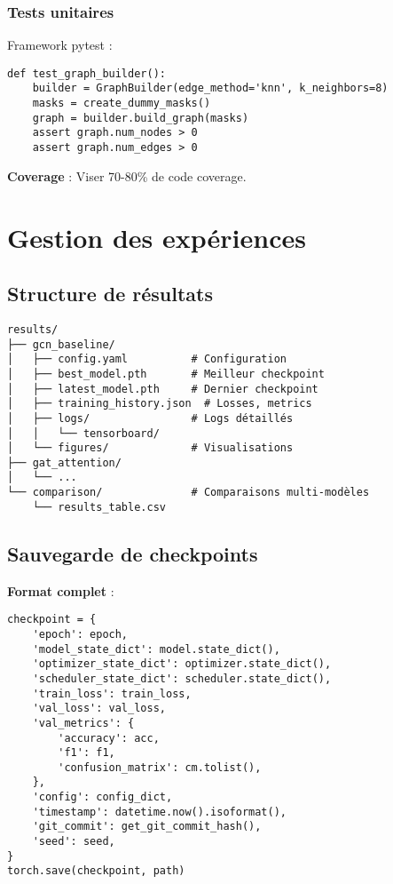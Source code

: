 \subsubsection{Tests unitaires}

Framework pytest :
\begin{verbatim}
def test_graph_builder():
    builder = GraphBuilder(edge_method='knn', k_neighbors=8)
    masks = create_dummy_masks()
    graph = builder.build_graph(masks)
    assert graph.num_nodes > 0
    assert graph.num_edges > 0
\end{verbatim}

\textbf{Coverage} : Viser 70-80\% de code coverage.

\section{Gestion des expériences}

\subsection{Structure de résultats}

\begin{verbatim}
results/
├── gcn_baseline/
│   ├── config.yaml          # Configuration
│   ├── best_model.pth       # Meilleur checkpoint
│   ├── latest_model.pth     # Dernier checkpoint
│   ├── training_history.json  # Losses, metrics
│   ├── logs/                # Logs détaillés
│   │   └── tensorboard/
│   └── figures/             # Visualisations
├── gat_attention/
│   └── ...
└── comparison/              # Comparaisons multi-modèles
    └── results_table.csv
\end{verbatim}

\subsection{Sauvegarde de checkpoints}

\textbf{Format complet} :
\begin{verbatim}
checkpoint = {
    'epoch': epoch,
    'model_state_dict': model.state_dict(),
    'optimizer_state_dict': optimizer.state_dict(),
    'scheduler_state_dict': scheduler.state_dict(),
    'train_loss': train_loss,
    'val_loss': val_loss,
    'val_metrics': {
        'accuracy': acc,
        'f1': f1,
        'confusion_matrix': cm.tolist(),
    },
    'config': config_dict,
    'timestamp': datetime.now().isoformat(),
    'git_commit': get_git_commit_hash(),
    'seed': seed,
}
torch.save(checkpoint, path)
\end{verbatim}

